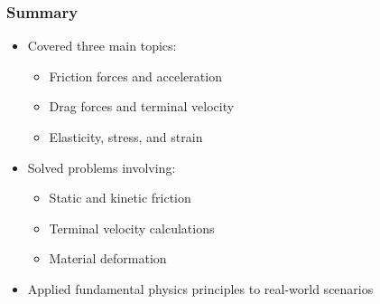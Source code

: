 \documentclass{beamer}
\begin{document}
\begin{frame}
\frametitle{Summary}
\begin{itemize}
    \item Covered three main topics:
    \begin{itemize}
        \item Friction forces and acceleration
        \item Drag forces and terminal velocity
        \item Elasticity, stress, and strain
    \end{itemize}
    \item Solved problems involving:
    \begin{itemize}
        \item Static and kinetic friction
        \item Terminal velocity calculations
        \item Material deformation
    \end{itemize}
    \item Applied fundamental physics principles to real-world scenarios
\end{itemize}
\end{frame}
\end{document}
